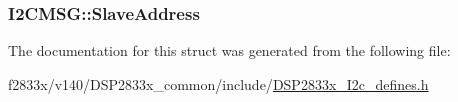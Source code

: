 \subsubsection[{Slave\+Address}]{ I2\+C\+M\+S\+G\+::\+Slave\+Address}\label{struct_i2_c_m_s_g_a540fef1ef283511a75046b8dabbbac39}


The documentation for this struct was generated from the following file\+:\begin{DoxyCompactItemize}
\item 
f2833x/v140/\+D\+S\+P2833x\+\_\+common/include/\hyperlink{_d_s_p2833x___i2c__defines_8h}{D\+S\+P2833x\+\_\+\+I2c\+\_\+defines.\+h}\end{DoxyCompactItemize}
